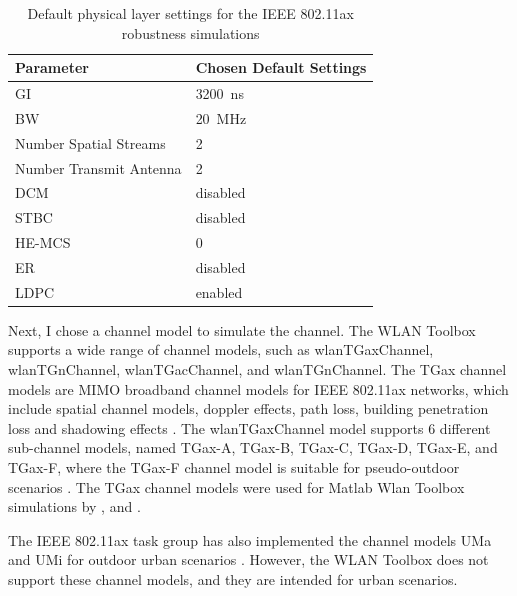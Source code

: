 \begin{table}
   \centering
   \begin{tabular}{>{\raggedright}p{4.5cm}p{4.5cm}}
      \toprule
      Parameter & Chosen Default Settings \\
      \midrule
      \ac{GI} & \SI{3200}{\nano\second} \\
      \ac{BW} & \SI{20}{\mega\hertz} \\
      Number Spatial Streams & \num{2}\\
      Number Transmit Antenna & \num{2} \\
      \ac{DCM} & disabled \\
      \ac{STBC} & disabled \\
      \ac{HE}-\ac{MCS} & \num{0} \\
      \ac{ER} & disabled \\
      \ac{LDPC} & enabled \\
      \bottomrule
   \end{tabular}
   \caption{Default physical layer settings for the IEEE 802.11ax robustness simulations}
   \label{tab:robustnessDefaultSettings}
\end{table}

Next, I chose a channel model to simulate the channel.
The WLAN Toolbox supports a wide range of channel models, such as wlanTGaxChannel, wlanTGnChannel, wlanTGacChannel, and wlanTGnChannel.
The TGax channel models are \ac{MIMO} broadband channel models for IEEE 802.11ax networks, which include spatial channel models, doppler effects,
path loss, building penetration loss and shadowing effects \cite{TGAXCHANNEL}.
The wlanTGaxChannel model supports \num{6} different sub-channel models, named TGax-A, TGax-B, TGax-C, TGax-D, TGax-E, and TGax-F,
where the TGax-F channel model is suitable for pseudo-outdoor scenarios \cite{TGAXCHANNEL}.
The TGax channel models were used for Matlab Wlan Toolbox simulations by \cite{sheela_performance_2022}, \cite{cao_efficient_2022} and \cite{jin_efficient_2021}.

The IEEE 802.11ax task group has also implemented the channel models UMa and UMi for outdoor urban scenarios \cite{TGAXCHANNEL, omar_survey_2016}.
However, the WLAN Toolbox does not support these channel models, and they are intended for urban scenarios.




